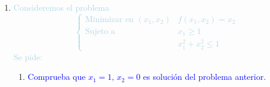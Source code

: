 \documentclass[a4paper]{article}
\newcommand{\bboxed}[1]{\fcolorbox{lightblue}{lightblue!10}{$#1$}}
\newcommand{\lb}[1]{\textcolor{lightblue}{#1}}
\newcommand{\db}[1]{\textcolor{blue}{#1}}
\begin{document}
\begin{enumerate}[label=\color{red}\arabic*.]
\begin{enumerate}[label=\color{red}\alph*)]
    	$\Theta(\mu)=\mathcal{L}(\mu-1,\mu-1,\mu)=\mu-1+\mu-\mu+\dfrac{1}{2}\left[(\mu1)^2+(\mu-1)^2\right]+\mu(1-\mu+1-\mu+1)=-\mu^2+3\mu-1$
    	
    	\[ (Dual)=\begin{cases}
    	\text{Maximizar} & \Theta(\mu)=-\mu^2+3\mu-1\\
    	\text{Sujeto a} & \mu\ge0
    	\end{cases} \]
    	
    	$\Theta'(\mu)=-2\mu+3=0\longrightarrow\bboxed{\mu*=\dfrac{3}{2}}$
    	
    	
    	\item \db{Resuelve el problema dual anterior e infiere de ello que la solución del problema original es $x_1=x_2=\dfrac{1}{2}$.}
    	$\begin{array}{l}
    	x_1^*=x_2^*=\dfrac{3}{2}-1=\dfrac{1}{2}
    	\end{array}$
    \end{enumerate}
    \item \lb{Consideremos el problema \[ \begin{cases}
    \text{Minimizar en }(x_1,x_2) & f(x_1,x_2)=x_2\\
    \text{Sujeto a}& x_1\ge1\\
     & x_1^2+x_2^2\le1
    \end{cases} \]Se pide:}
    \begin{enumerate}[label=\color{red}\alph*)]
    	\item \db{Comprueba que $x_1=1,\, x_2=0$ es solución del problema anterior.}
    	

\end{enumerate}
\end{enumerate}
\end{document}
